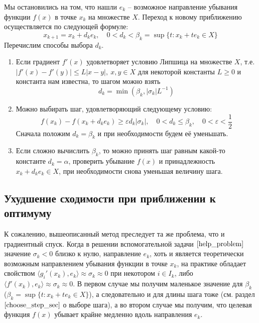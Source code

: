 \documentclass{article}
\theoremstyle{plain}
\theoremstyle{definition}
\begin{document}
Мы остановились на том, что нашли $e_k$ -- возможное направление убывания функции $f(x)$ в точке $x_k$ на множестве $X$. Переход к новому приближению осуществляется по следующей формуле:
\begin{equation}
x_{k+1} = x_k + d_k e_k, \quad 0 < d_k < \beta_k=\sup \lbrace t: x_k+te_k \in X \rbrace 
\end{equation}
Перечислим способы выбора $d_k$.
\begin{enumerate}

\item Если градиент $f'(x)$ удовлетворяет условию Липшица на множестве $X$, т.е. $|f'(x)-f'(y)| \leqslant L|x-y|,~ x,y \in X$ для некоторой константы $L \geqslant 0$ и константа нам известна, то шагом можно взять
\begin{equation}
d_k =  \min(\beta_k, |\sigma_k|L^{-1})
\end{equation}

\item Можно выбирать шаг, удовлетворяющий следующему условию:
\begin{equation}
f(x_k) - f(x_k + d_k e_k) \geqslant \varepsilon d_k |\sigma_k|, \quad 0 < d_k \leqslant \beta_k, \quad 0 < \varepsilon < \frac{1}{2}
\end{equation}
Сначала положим $d_k = \beta_k$ и при необходимости будем её уменьшать.

\item Если сложно вычислить $\beta_k$, то можно принять шаг равным какой-то константе $d_k = \alpha$, проверить убывание $f(x)$ и принадлежность $x_k + d_k e_k \in X$, при необходимости снова уменьшая величину шага.
\end{enumerate}

\subsection{Ухудшение сходимости при приближении к оптимуму}
К сожалению, вышеописанный метод преследует та же проблема, что и градиентный спуск. Когда в решении вспомогательной задачи $\eqref{help_problem}$ значение $\sigma_k < 0$ близко к нулю, направление $e_k$, хоть и является теоретически возможным направлением убывания функции в точке $x_k$, на практике обладает свойством $\langle g_i'(x_k), e_k \rangle\approx\sigma_k\approx 0$ при некотором $i \in I_k$, либо $\langle f'(x_k), e_k \rangle\approx\sigma_k\approx 0$. В первом случае мы получим маленькое значение для $\beta_k$ ($\beta_k=\sup \lbrace t: x_k+te_k \in X \rbrace$), а следовательно и для длины шага тоже (см. раздел $\ref{choose_step_sec}$ о выборе шага), а во втором случае мы получим, что целевая функция $f(x)$ убывает крайне медленно вдоль направления $e_k$.
\end{document}
